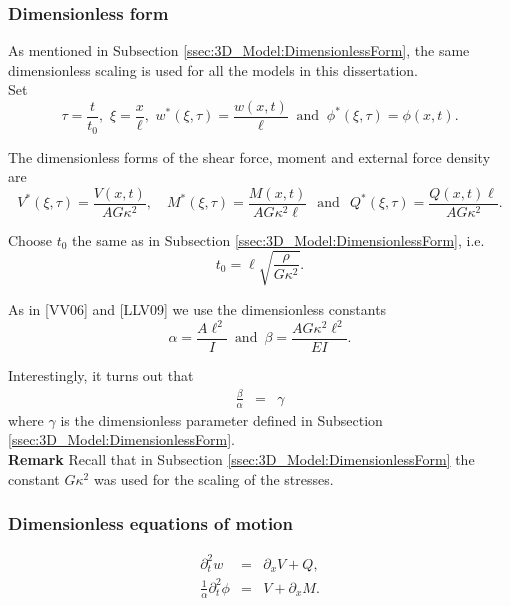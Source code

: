 \documentclass[../../main.tex]{subfiles}
\begin{document}
    \subsubsection*{Dimensionless form}\label{sssec:1D_Model:DimensionlessForm}
    As mentioned in Subsection \ref{ssec:3D_Model:DimensionlessForm}, the same dimensionless scaling is used for all the models in this dissertation.\\

    Set \[\tau = \frac{t}{t_0}, \,\, \xi = \frac{x}{\ell}, \,\, w^*(\xi,\tau) = \frac{w(x,t)}{\ell} \ \text{ and } \ \phi^*(\xi, \tau) = \phi(x,t).\]

    The dimensionless forms of the shear force, moment and external force density are \[ V^{*}(\xi,\tau) = \frac{V(x,t)}{AG\kappa^2}, \quad M^{*}(\xi,\tau) = \frac{M(x,t)}{A G\kappa^2 \ell} \,\,\, \ \text{and} \ \,\,\, Q^*(\xi,\tau) = \frac{Q(x,t)\ell}{A G\kappa^2}.\]

    Choose $t_0$ the same as in Subsection \ref{ssec:3D_Model:DimensionlessForm}, i.e. \[t_0 = \ell\sqrt{\frac{\rho}{G\kappa^2}}.\]

    As in [VV06] and [LLV09] we use the dimensionless constants
    \begin{equation*}
        \alpha = \frac{A \ell^2}{I} \,\,\, \text{and} \,\,\, \beta
        =\frac{AG\kappa^2 \ell^2}{EI}.
    \end{equation*}\label{sym:alphabeta}

    Interestingly, it turns out that
    \begin{eqnarray*}
        \frac{\beta}{\alpha} & = & \gamma
    \end{eqnarray*} where $\gamma$ is the dimensionless parameter defined in Subsection \ref{ssec:3D_Model:DimensionlessForm}.\\

    \textbf{Remark} Recall that in Subsection \ref{ssec:3D_Model:DimensionlessForm} the constant $G\kappa^2$ was used for the scaling of the stresses.

    \subsubsection*{Dimensionless equations of motion}\label{sssec:1D_Model:DimensionlessEquationsOfMotion}
    \begin{eqnarray}
        \partial_{t}^{2} w &=& \partial_{x}V + Q, \label{eq:1D_Model:EquationOfMotion1D}\\
        \frac{1}{\alpha} \partial_{t}^{2} \phi &=& V + \partial_{x}M.\label{eq:1D_Model:EquationOfMotion2D}
    \end{eqnarray}
\end{document}
